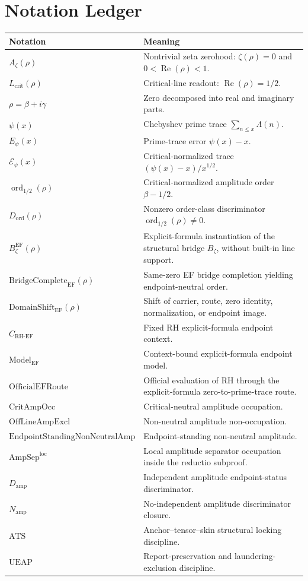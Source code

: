 \documentclass[11pt]{article}
\DeclareMathOperator{\Ree}{Re}
\newcommand{\Az}{A_{\zeta}}
\newcommand{\Lcrit}{L_{\mathrm{crit}}}
\newcommand{\ATS}{\mathrm{ATS}}
\newcommand{\UEAP}{\mathrm{UEAP}}
\newcommand{\CRHEF}{C_{\mathrm{RH}\text{-}\mathrm{EF}}}
\newcommand{\ModelEF}{\mathrm{Model}_{\mathrm{EF}}}
\newcommand{\OfficialEFRoute}{\mathrm{OfficialEFRoute}}
\newcommand{\CritAmpOcc}{\mathrm{CritAmpOcc}}
\newcommand{\OffAmpExcl}{\mathrm{OffLineAmpExcl}}
\newcommand{\AmpSepLoc}{\mathrm{AmpSep}^{\mathrm{loc}}}
\newcommand{\Damp}{D_{\mathrm{amp}}}
\newcommand{\Namp}{N_{\mathrm{amp}}}
\newcommand{\psierr}{E_{\psi}}
\newcommand{\psinorm}{\mathcal E_{\psi}}
\newcommand{\AmpStand}{\mathrm{EndpointStandingNonNeutralAmp}}
\newcommand{\ordhalf}{\operatorname{ord}_{1/2}}
\newcommand{\Dord}{D_{\mathrm{ord}}}
\newcommand{\BzetaEF}{B^{\mathrm{EF}}_{\zeta}}
\newcommand{\BridgeCompleteEF}{\mathrm{BridgeComplete}_{\mathrm{EF}}}
\newcommand{\DomainShiftEF}{\mathrm{DomainShift}_{\mathrm{EF}}}
\begin{document}
\section{Notation Ledger}\label{app:notation}

\begin{longtable}{L{0.26\textwidth}L{0.64\textwidth}}
\toprule
\textbf{Notation} & \textbf{Meaning}\\
\midrule
\(\Az(\rho)\) & Nontrivial zeta zerohood: \(\zeta(\rho)=0\) and \(0<\Ree(\rho)<1\).\\
\(\Lcrit(\rho)\) & Critical-line readout: \(\Ree(\rho)=1/2\).\\
\(\rho=\beta+i\gamma\) & Zero decomposed into real and imaginary parts.\\
\(\psi(x)\) & Chebyshev prime trace \(\sum_{n\le x}\Lambda(n)\).\\
\(\psierr(x)\) & Prime-trace error \(\psi(x)-x\).\\
\(\psinorm(x)\) & Critical-normalized trace \((\psi(x)-x)/x^{1/2}\).\\
\(\ordhalf(\rho)\) & Critical-normalized amplitude order \(\beta-1/2\).\\
\(\Dord(\rho)\) & Nonzero order-class discriminator \(\ordhalf(\rho)\ne0\).\\
\(\BzetaEF(\rho)\) & Explicit-formula instantiation of the structural bridge \(B_\zeta\), without built-in line support.\\
\(\BridgeCompleteEF(\rho)\) & Same-zero EF bridge completion yielding endpoint-neutral order.\\
\(\DomainShiftEF(\rho)\) & Shift of carrier, route, zero identity, normalization, or endpoint image.\\
\(\CRHEF\) & Fixed RH explicit-formula endpoint context.\\
\(\ModelEF\) & Context-bound explicit-formula endpoint model.\\
\(\OfficialEFRoute\) & Official evaluation of RH through the explicit-formula zero-to-prime-trace route.\\
\(\CritAmpOcc\) & Critical-neutral amplitude occupation.\\
\(\OffAmpExcl\) & Non-neutral amplitude non-occupation.\\
\(\AmpStand\) & Endpoint-standing non-neutral amplitude.\\
\(\AmpSepLoc\) & Local amplitude separator occupation inside the reductio subproof.\\
\(\Damp\) & Independent amplitude endpoint-status discriminator.\\
\(\Namp\) & No-independent amplitude discriminator closure.\\
\(\ATS\) & Anchor--tensor--skin structural locking discipline.\\
\(\UEAP\) & Report-preservation and laundering-exclusion discipline.\\
\bottomrule
\end{longtable}
\end{document}
